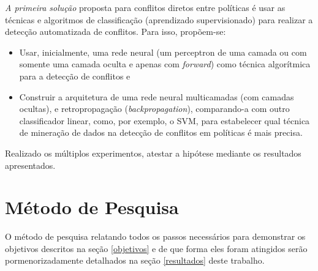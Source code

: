 \documentclass[
	12pt,				%
	openright,			%
	twoside,			%
	a4paper,			%
	english,			%
	french,				%
	spanish,			%
	brazil				%
	]{abntex2}
\begin{document}
\textit{A primeira solução} proposta para conflitos diretos entre políticas é usar as técnicas e algoritmos de classificação (aprendizado supervisionado) para  realizar a detecção automatizada de conflitos. Para isso, propõem-se:
\begin{itemize}
	\item Usar, inicialmente, uma rede neural (um perceptron de uma camada ou com somente uma camada oculta e apenas com \textit{forward}) como técnica algorítmica para a detecção de conflitos e
	\item Construir a arquitetura de uma rede neural multicamadas (com camadas ocultas), e retropropagação (\textit{backpropagation}), comparando-a com outro classificador linear, como, por exemplo, o SVM, para estabelecer qual técnica de mineração de dados na detecção de conflitos em políticas é mais precisa.	
\end{itemize}
Realizado os múltiplos experimentos, atestar a hipótese mediante os resultados apresentados.

\section{Método de Pesquisa} 
O método de pesquisa relatando todos os passos necessários para demonstrar os objetivos descritos na seção \ref{objetivos} e de que forma eles foram atingidos serão pormenorizadamente detalhados na seção \ref{resultados} deste trabalho.
\end{document}
